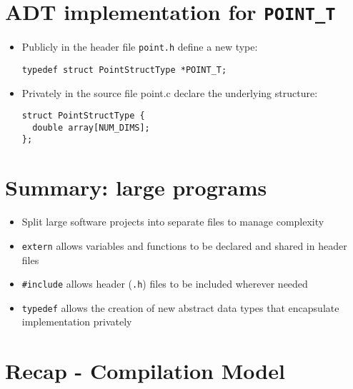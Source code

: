 \documentclass{article}
\begin{document}
\section{ADT implementation for \texttt{POINT\_T}}
\begin{itemize}
\item Publicly in the header file \verb!point.h! define a new type:
\begin{verbatim}
typedef struct PointStructType *POINT_T;
\end{verbatim}

\item Privately in the source file point.c declare the underlying structure:

\begin{verbatim}
struct PointStructType {
  double array[NUM_DIMS];
};
\end{verbatim}
\end{itemize}



\section{Summary: large programs}
\begin{itemize}
\item Split large software projects into separate files to manage complexity

\item \verb!extern! allows variables and functions to be declared and shared in header files

\item \verb!#include! allows header (\verb!.h!) files to be included wherever needed

\item \verb!typedef! allows the creation of new abstract data types that encapsulate implementation privately
\end{itemize}



\section{Recap - Compilation Model}
\end{document}
